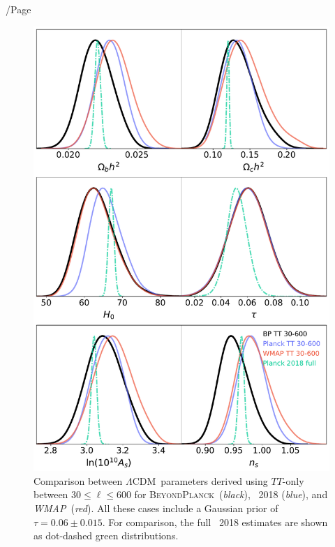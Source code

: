 /Page\documentclass[twocolumn]{aa}
\def\WMAP{\textit{WMAP}}
\def\LCDM{$\Lambda$CDM}
\newcommand{\BP}{\textsc{BeyondPlanck}}
\begin{document}
\begin{figure}[t]
	\center
	\includegraphics[width=\linewidth]{figs/BP10_LCDM_30-600.pdf}
	\caption{Comparison between \LCDM\ parameters derived using
          $TT$-only between $30\le\ell\le600$ for
          \BP\ (\emph{black}), \Planck\ 2018 (\emph{blue}), and
          \WMAP\ (\emph{red}).  All these cases include a Gaussian
          prior of $\tau=0.06\pm0.015$.  For comparison, the full
          \Planck\ 2018 estimates are shown as dot-dashed green
          distributions.}
	\label{fig:GBR-600}	
\end{figure}
 
\end{document}
